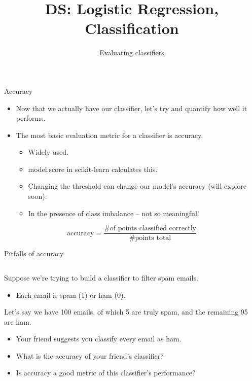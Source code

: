 \documentclass[aspectratio=169]{../latex_main/tntbeamer}  %
\title[Introduction]{DS: Logistic Regression, Classification}
\subtitle{Evaluating classifiers}
\begin{document}
	
	\maketitle
	\begin{frame}{Accuracy}
	    \begin{itemize}
	        \item Now that we actually have our classifier, let’s try and quantify how well it performs.
	        \item The most basic evaluation metric for a classifier is accuracy.
	        \begin{itemize}
	            \item Widely used.
	            \item model.score in scikit-learn calculates this.
	            \item Changing the threshold can change our model’s accuracy (will explore soon).
	            \item In the presence of class imbalance – not so meaningful!
	        \end{itemize}
	    \end{itemize}
	    \begin{equation*}
	        \text{accuracy} = \frac{\# \text{of points classified correctly}}{\# \text{points total}}
	    \end{equation*}
	\end{frame}
	
	
	\begin{frame}[c]{Pitfalls of accuracy}
	    \begin{columns}
	        \begin{column}{.5\textwidth}
                 Suppose we’re trying to build a classifier to filter spam emails.
        	    \begin{itemize}
        	        \item Each email is spam (1) or ham (0).
        	    \end{itemize}
        	    Let’s say we have 100 emails, of which 5 are truly spam, and the remaining 95 are ham.
        	    \begin{itemize}
        	        \item Your friend suggests you classify every email as ham.
        	        \item What is the accuracy of your friend’s classifier?
        	        \item Is accuracy a good metric of this classifier’s performance?
        	    \end{itemize}
	        \end{column}
	        
	        
	        \begin{column}{.5\textwidth}
	                
	        \end{column}
	    \end{columns}
	   
	\end{frame}
	
\end{document}
